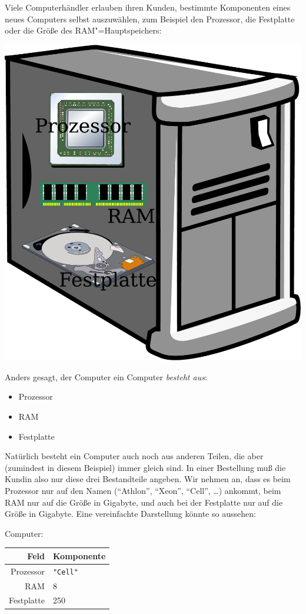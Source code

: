 Viele Computerhändler erlauben ihren Kunden, bestimmte Komponenten
eines neues Computers selbst auszuwählen, zum Beispiel den Prozessor,
die Festplatte oder die Größe des RAM"=Hauptspeichers:
%
\begin{center}
  \medskip
  \includegraphics[height=0.3\textheight]{computer}
  \medskip
\end{center}
%
Anders gesagt, der Computer ein Computer \emph{besteht aus}:
%
\begin{itemize}
\item Prozessor
\item RAM
\item Festplatte
\end{itemize}
%
Natürlich besteht ein Computer auch noch aus anderen Teilen, die
aber (zumindest in diesem Beispiel) immer gleich sind.  In einer Bestellung muß
die Kundin also nur diese drei Bestandteile angeben.  Wir nehmen an,
dass es beim Prozessor nur auf den Namen ("`Athlon"', "`Xeon"',
"`Cell"', \ldots) ankommt, beim RAM nur auf die Größe in Gigabyte, und
auch bei der Festplatte nur auf die Größe in Gigabyte.  Eine
vereinfachte Darstellung könnte so aussehen:
%
\begin{center}
  Computer:
  \begin{tabular}[c]{r|l}
    \textbf{Feld} & \textbf{Komponente}\\\hline
    \hline
     Prozessor & \verb|"Cell"|\\
     \hline
     RAM & 8\\
    \hline 
    Festplatte & 250
  \end{tabular}
\end{center}
